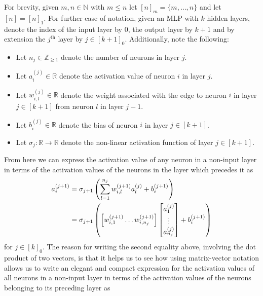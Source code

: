 \documentclass[11pt]{article}
\begin{document}
For brevity, given $m,n\in\mathbb{N}$ with $m\leq n$ let $[n]_m=\{m,\dots,n\}$ and let $[n]=[n]_1$. For further ease of notation, given an MLP with $k$ hidden layers, denote the index of the input layer by $0$, the output layer by $k+1$ and by extension the $j^{\text{th}}$ layer by $j\in[k+1]_0$. Additionally, note the following:
\begin{itemize}
    \item Let $n_j\in\mathbb{Z}_{\geq1}$ denote the number of neurons in layer $j$.
    \item Let $a_i^{(j)}\in\mathbb{R}$ denote the activation value of neuron $i$ in layer $j$.
    \item Let $w_{i,l}^{(j)}\in\mathbb{R}$ denote the weight associated with the edge to neuron $i$ in layer $j\in[k+1]$ from neuron $l$ in layer $j-1$.
    \item Let $b_i^{(j)}\in\mathbb{R}$ denote the bias of neuron $i$ in layer $j\in[k+1]$.
    \item Let $\sigma_j:\mathbb{R}\rightarrow\mathbb{R}$ denote the non-linear activation function of layer $j\in[k+1]$.
\end{itemize}
From here we can express the activation value of any neuron in a non-input layer in terms of the activation values of the neurons in the layer which precedes it as
\begin{align*}
    a_i^{(j+1)}
    &=
    \sigma_{j+1}\left(
    \sum_{l=1}^{n_j} w_{i,l}^{(j+1)}a_l^{(j)} + b_i^{(j+1)}
    \right)\\
    &=
    \sigma_{j+1}\left(
    \left[w_{i,1}^{(j+1)} \dots w_{i,n_j}^{(j+1)}\right]
    \begin{bmatrix}
        a_1^{(j)}\\
        \vdots\\
        a_{n_j}^{(j)}
    \end{bmatrix}
    +
    b_i^{(j+1)}
\right)
\end{align*}
for $j\in[k]_0$. The reason for writing the second equality above, involving the dot product of two vectors, is that it helps us to see how using matrix-vector notation allows us to write an elegant and compact expression for the activation values of all neurons in a non-input layer in terms of the activation values of the neurons belonging to its preceding layer as
\end{document}
